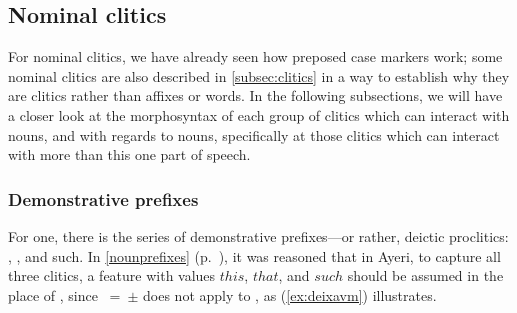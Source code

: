 
\subsection{Nominal clitics}
\label{subsec:nomcl}

For nominal clitics, we have already seen how preposed case markers work; some
nominal clitics are also described in \autoref{subsec:clitics} in a way to
establish why they are clitics rather than affixes or words. In the following
subsections, we will have a closer look at the morphosyntax of each group of
clitics which can interact with nouns, and with regards to nouns, specifically
at those clitics which can interact with more than this one part of speech.

\subsubsection{Demonstrative prefixes}
\label{subsubsec:deixprocl}

For one, there is the series of demonstrative prefixes---or rather, deictic
proclitics: , , and 
{such}. In \autoref{nounprefixes} (p.~\pageref{nounprefixes}), it was
reasoned that in Ayeri, to capture all three clitics, a feature \Deix{} with
values $this$, $that$, and $such$ should be assumed in the place of \Prox{},
since \ups{\Prox{}}~=~$\pm$ does not apply to , as (\ref{ex:deixavm})
illustrates.

